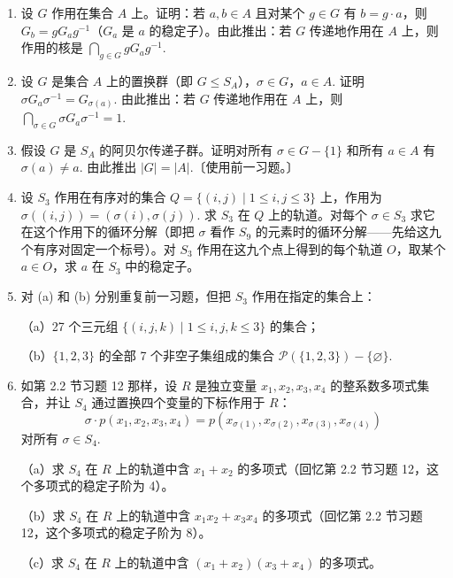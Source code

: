 \begin{enumerate}
\item 设 \(G\) 作用在集合 \(A\) 上。证明：若 \(a, b \in A\) 且对某个 \(g \in G\) 有 \(b = g \cdot a\)，则 \(G_b = gG_a g^{-1}\)（\(G_a\) 是 \(a\) 的稳定子）。由此推出：若 \(G\) 传递地作用在 \(A\) 上，则作用的核是 \(\bigcap_{g \in G} gG_a g^{-1}\).

\item 设 \(G\) 是集合 \(A\) 上的置换群（即 \(G \leq S_A\)），\(\sigma \in G\)，\(a \in A\). 证明 \(\sigma G_a \sigma^{-1} = G_{\sigma(a)}\). 由此推出：若 \(G\) 传递地作用在 \(A\) 上，则 \(\bigcap_{\sigma \in G} \sigma G_a \sigma^{-1} = 1\).

\item 假设 \(G\) 是 \(S_A\) 的阿贝尔传递子群。证明对所有 \(\sigma \in G - \{1\}\) 和所有 \(a \in A\) 有 \(\sigma(a) \neq a\). 由此推出 \(|G| = |A|\).〔使用前一习题。〕

\item 设 \(S_3\) 作用在有序对的集合 \(Q = \{(i, j) \mid 1 \leq i, j \leq 3\}\) 上，作用为 \(\sigma((i, j)) = (\sigma(i), \sigma(j))\). 求 \(S_3\) 在 \(Q\) 上的轨道。对每个 \(\sigma \in S_3\) 求它在这个作用下的循环分解（即把 \(\sigma\) 看作 \(S_9\) 的元素时的循环分解——先给这九个有序对固定一个标号）。对 \(S_3\) 作用在这九个点上得到的每个轨道 \(O\)，取某个 \(a \in O\)，求 \(a\) 在 \(S_3\) 中的稳定子。

\item 对 (a) 和 (b) 分别重复前一习题，但把 \(S_3\) 作用在指定的集合上：

（a）27 个三元组 \(\{(i, j, k) \mid 1 \leq i, j, k \leq 3\}\) 的集合；

（b）\(\{1, 2, 3\}\) 的全部 7 个非空子集组成的集合 \(\mathcal{P}(\{1, 2, 3\}) - \{\varnothing\}\).

\item 如第 2.2 节习题 12 那样，设 \(R\) 是独立变量 \(x_1, x_2, x_3, x_4\) 的整系数多项式集合，并让 \(S_4\) 通过置换四个变量的下标作用于 \(R\)：
\[
\sigma \cdot p(x_1, x_2, x_3, x_4) = p(x_{\sigma(1)}, x_{\sigma(2)}, x_{\sigma(3)}, x_{\sigma(4)})
\]
对所有 \(\sigma \in S_4\).

（a）求 \(S_4\) 在 \(R\) 上的轨道中含 \(x_1 + x_2\) 的多项式（回忆第 2.2 节习题 12，这个多项式的稳定子阶为 4）。

（b）求 \(S_4\) 在 \(R\) 上的轨道中含 \(x_1x_2 + x_3x_4\) 的多项式（回忆第 2.2 节习题 12，这个多项式的稳定子阶为 8）。

（c）求 \(S_4\) 在 \(R\) 上的轨道中含 \((x_1 + x_2)(x_3 + x_4)\) 的多项式。


\end{enumerate}
